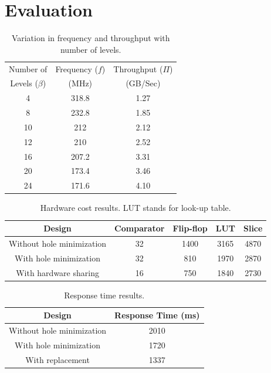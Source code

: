 \section{Evaluation}
\label{s:eval}

\begin{table}[!ht]
 \begin{center}
 \caption{Variation in frequency and throughput with number of levels.}
\label{table1}
\begin{tabular}{ |c|c|c| }
 \hline
 Number of & Frequency ($f$) & Throughput ($\Pi$) \\
 Levels ($\beta$) & (MHz)& (GB/Sec)\\
 \hline
 \hline
 4 & 318.8 &  1.27\\
 8 & 232.8 &  1.85\\
 10 & 212 &  2.12 \\
 12 & 210 &  2.52 \\
 16 & 207.2 &  3.31\\
 20 & 173.4 &  3.46 \\
 24 & 171.6 &  4.10\\
 \hline
\end{tabular}
\end{center}
\end{table}

\begin{table}[!ht]
 \begin{center}
 \caption{Hardware cost results. LUT stands for look-up table.}
\label{table2}
\begin{tabular}{|c|c|c|c|c|}
 \hline
 Design  & Comparator  & Flip-flop & LUT &Slice \\
 \hline
 \hline
Without hole minimization & 32 & 1400 & 3165 & 4870 \\
 \hline
With hole minimization & 32 & 810 & 1970 & 2870 \\
  \hline
With hardware sharing & 16 & 750 & 1840 & 2730 \\
\hline
\end{tabular}
\end{center}
\end{table}

\begin{table}[!ht]
 \begin{center}
 \caption{Response time results.}
\label{table3}
\begin{tabular}{ |c|c|}
 \hline
 Design  &  Response Time (ms) \\
 \hline
Without hole minimization & 2010 \\
  \hline
With hole minimization & 1720 \\
  \hline
With replacement & 1337 \\
  \hline
\end{tabular}
\end{center}
\end{table}

